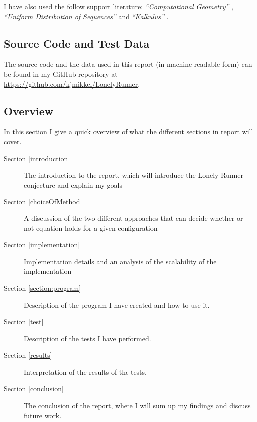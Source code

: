 I have also used the follow support literature:
\emph{``Computational Geometry''} \cite{citeulike:3347056}, \emph{``Uniform Distribution of Sequences''} \cite{uniform} and \emph{``Kalkulus''} \cite{kalkulus}.

\subsection{Source Code and Test Data}
The source code and the data used in this report (in machine readable form) can be found in my GitHub repository at \underline{https://github.com/kjmikkel/LonelyRunner}.

\subsection{Overview}
In this section I give a quick overview of what the different sections in report will cover.
\begin{description}
\item[Section \ref{introduction}] The introduction to the report, which will introduce the Lonely Runner conjecture and explain my goals
\item[Section \ref{choiceOfMethod}] A discussion of the two different approaches that can decide whether or not equation  holds for a given configuration
\item[Section \ref{implementation}] Implementation details and an analysis of the scalability of the implementation
\item[Section \ref{section:program}] Description of the program I have created and how to use it.
\item[Section \ref{test}] Description of the tests I have performed.
\item[Section \ref{results}] Interpretation of the results of the tests.
\item[Section \ref{conclusion}] The conclusion of the report, where I will sum up my findings and discuss future work.
\end{description}
